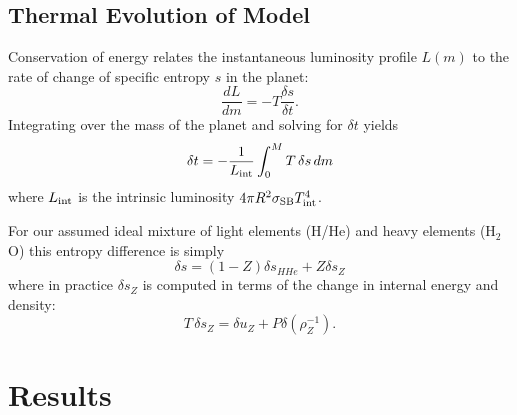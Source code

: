 \documentclass[11pt]{ucscthesisbs}
\begin{document}

\section{Thermal Evolution of Model}
Conservation of energy relates the instantaneous luminosity profile $L(m)$ to the rate of change of specific entropy $s$ in the planet:
\begin{equation}
  \frac{dL}{dm}=-T\frac{\delta s}{\delta t}.
\end{equation}
Integrating over the mass of the planet and solving for $\delta t$ yields
\begin{equation}
\delta t=-\frac{1}{L_{\rm int}}\int_0^M T\,\delta s\,dm
\end{equation}
where $L_{\rm int}$ is the intrinsic luminosity $4\pi R^2\sigma_{\rm SB}T_{\rm int}^4$.

For our assumed ideal mixture of light elements (H/He) and heavy elements (H$_2$O) this entropy difference is simply
\begin{equation}
  \delta s = (1-Z)\delta s_{HHe} + Z\delta s_Z
\end{equation}
where in practice $\delta s_Z$ is computed in terms of the change in internal energy and density:
\begin{equation}
  T\,\delta s_Z = \delta u_Z + P\delta\left(\rho_Z^{-1}\right).
\end{equation}

\chapter{Results}
\end{document}
